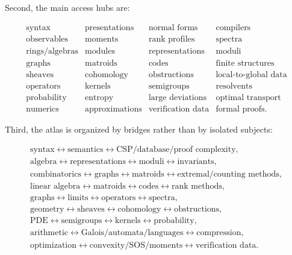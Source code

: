 \documentclass[11pt]{article}
\begin{document}
Second, the main access hubs are:

\[
\begin{array}{cccc}
\text{syntax} & \text{presentations} & \text{normal forms} & \text{compilers} \\
\text{observables} & \text{moments} & \text{rank profiles} & \text{spectra} \\
\text{rings/algebras} & \text{modules} & \text{representations} & \text{moduli} \\
\text{graphs} & \text{matroids} & \text{codes} & \text{finite structures} \\
\text{sheaves} & \text{cohomology} & \text{obstructions} & \text{local-to-global data} \\
\text{operators} & \text{kernels} & \text{semigroups} & \text{resolvents} \\
\text{probability} & \text{entropy} & \text{large deviations} & \text{optimal transport} \\
\text{numerics} & \text{approximations} & \text{verification data} & \text{formal proofs}.
\end{array}
\]

Third, the atlas is organized by bridges rather than by isolated subjects:

\[
\begin{gathered}
\text{syntax} \leftrightarrow \text{semantics} \leftrightarrow \text{CSP/database/proof complexity},\\
\text{algebra} \leftrightarrow \text{representations} \leftrightarrow \text{moduli} \leftrightarrow \text{invariants},\\
\text{combinatorics} \leftrightarrow \text{graphs} \leftrightarrow \text{matroids} \leftrightarrow \text{extremal/counting methods},\\
\text{linear algebra} \leftrightarrow \text{matroids} \leftrightarrow \text{codes} \leftrightarrow \text{rank methods},\\
\text{graphs} \leftrightarrow \text{limits} \leftrightarrow \text{operators} \leftrightarrow \text{spectra},\\
\text{geometry} \leftrightarrow \text{sheaves} \leftrightarrow \text{cohomology} \leftrightarrow \text{obstructions},\\
\text{PDE} \leftrightarrow \text{semigroups} \leftrightarrow \text{kernels} \leftrightarrow \text{probability},\\
\text{arithmetic} \leftrightarrow \text{Galois/automata/languages} \leftrightarrow \text{compression},\\
\text{optimization} \leftrightarrow \text{convexity/SOS/moments} \leftrightarrow \text{verification data}.
\end{gathered}
\]
\end{document}
